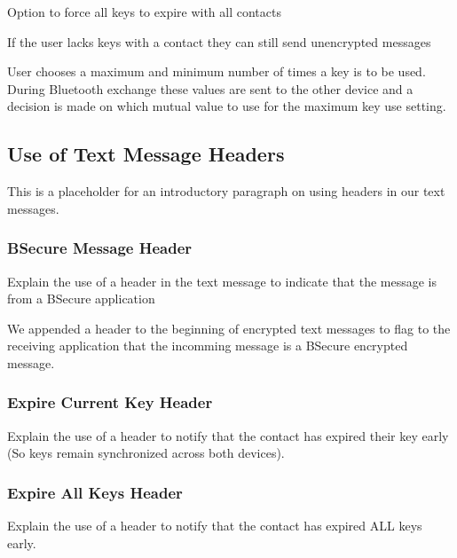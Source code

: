 Option to force all keys to expire with all contacts

If the user lacks keys with a contact they can still send unencrypted messages

User chooses a maximum and minimum number of times a key is to be used. During Bluetooth exchange
these values are sent to the other device and a decision is made on which mutual value to use for the maximum key use setting.

\subsection{Use of Text Message Headers}
This is a placeholder for an introductory paragraph on using headers in our text messages.

\subsubsection{BSecure Message Header}
Explain the use of a header in the text message to indicate that the message is from a BSecure application

We appended a header to the beginning of encrypted text messages to flag to the receiving application that
the incomming message is a BSecure encrypted message.

\subsubsection{Expire Current Key Header}
Explain the use of a header to notify that the contact has expired their key early (So keys remain synchronized across both devices).

\subsubsection{Expire All Keys Header}
Explain the use of a header to notify that the contact has expired ALL keys early.


